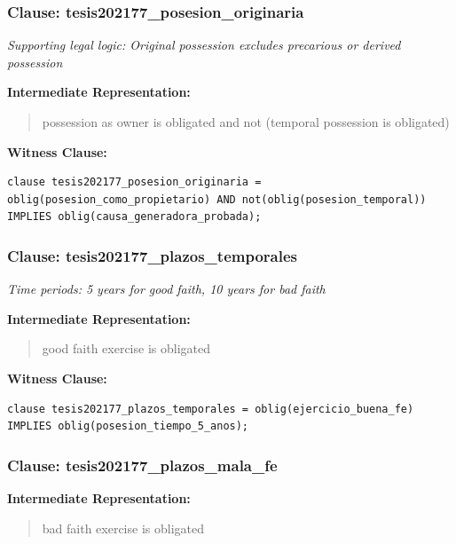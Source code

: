 \documentclass[11pt,a4paper]{article}
\begin{document}
\subsubsection{Clause: tesis202177\_posesion\_originaria}

\textit{Supporting legal logic: Original possession excludes precarious or derived possession}

\textbf{Intermediate Representation:}

\begin{quote}
possession as owner is obligated and not (temporal possession is obligated)
\end{quote}

\textbf{Witness Clause:}

\begin{lstlisting}[style=witnessstyle, language=Witness]
clause tesis202177_posesion_originaria = oblig(posesion_como_propietario) AND not(oblig(posesion_temporal)) IMPLIES oblig(causa_generadora_probada);
\end{lstlisting}

\subsubsection{Clause: tesis202177\_plazos\_temporales}

\textit{Time periods: 5 years for good faith, 10 years for bad faith}

\textbf{Intermediate Representation:}

\begin{quote}
good faith exercise is obligated
\end{quote}

\textbf{Witness Clause:}

\begin{lstlisting}[style=witnessstyle, language=Witness]
clause tesis202177_plazos_temporales = oblig(ejercicio_buena_fe) IMPLIES oblig(posesion_tiempo_5_anos);
\end{lstlisting}

\subsubsection{Clause: tesis202177\_plazos\_mala\_fe}

\textbf{Intermediate Representation:}

\begin{quote}
bad faith exercise is obligated
\end{quote}
\end{document}
